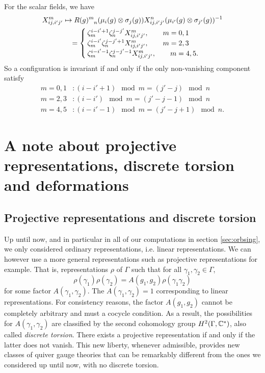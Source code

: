         For the scalar fields, we have
        \begin{align}
            X^m_{ij,i'j'}&\mapsto R(g)\indices{^m_n}(\mu_i(g)\otimes\sigma_j(g))X^n_{ij,i'j'}(\mu_{i'}(g)\otimes\sigma_{j'}(g))^{-1}\\
            &\quad =
            \begin{cases}
                \zeta^{i-i'+1}_m\zeta^{j-j'}_n X^m_{ij,i'j'},\qquad m=0,1\\
                \zeta^{i-i'}_m\zeta^{j-j'+1}_n X^m_{ij,i'j'},\qquad m=2,3\\
                \zeta^{i-i'-1}_m\zeta^{j-j'-1}_n X^m_{ij,i'j'},\qquad m=4,5.
            \end{cases}
        \end{align}
        So a configuration is invariant if and only if the only non-vanishing component satisfy
        \begin{align}
            m=0,1 &: (i-i'+1)\mod m = (j'-j)\mod n\\
            m=2,3 &: (i-i')\mod m = (j'-j-1)\mod n\\
            m=4,5 &: (i-i'-1)\mod m = (j'-j+1)\mod n.
        \end{align}

\section{A note about projective representations, discrete torsion and deformations}

    \subsection{Projective representations and discrete torsion}

        Up until now, and in particular in all of our computations in section \ref{sec:orbsing}, we only considered ordinary representations, i.e. linear representations. We can however use a more general representations such as projective representations for example. That is, representations $\rho$ of $\Gamma$ such that for all $\gamma_1,\gamma_2\in\Gamma$,
        \begin{equation}
            \rho(\gamma_1)\rho(\gamma_2)=A(g_1,g_2)\rho(\gamma_1\gamma_2)
        \end{equation}
        for some factor $A(\gamma_1,\gamma_2)$. The $A(\gamma_1,\gamma_2)=1$ corresponding to linear representations. For consistency reasons, the factor $A(g_1,g_2)$ cannot be completely arbitrary and must a cocycle condition. As a result, the possibilities for $A(\gamma_1,\gamma_2)$ are classified by the second cohomology group $H^2(\Gamma,\mathbb{C}^*)$, also called \emph{discrete torsion}. There exists a projective representation if and only if the latter does not vanish. This new liberty, whenever admissible, provides new classes of quiver gauge theories that can be remarkably different from the ones we considered up until now, with no discrete torsion.

